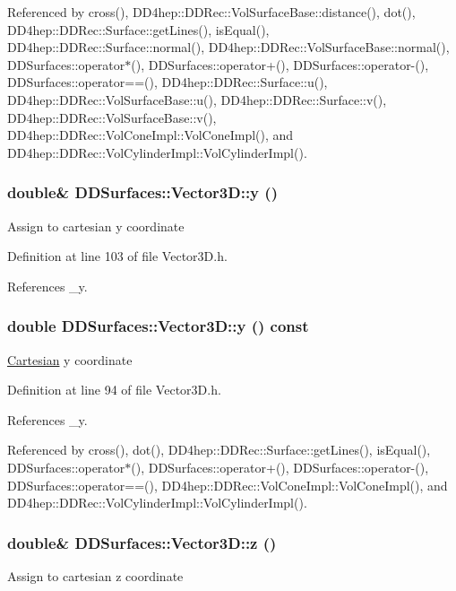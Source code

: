 Referenced by cross(), DD4hep::DDRec::VolSurfaceBase::distance(), dot(), DD4hep::DDRec::Surface::getLines(), isEqual(), DD4hep::DDRec::Surface::normal(), DD4hep::DDRec::VolSurfaceBase::normal(), DDSurfaces::operator$\ast$(), DDSurfaces::operator+(), DDSurfaces::operator-\/(), DDSurfaces::operator==(), DD4hep::DDRec::Surface::u(), DD4hep::DDRec::VolSurfaceBase::u(), DD4hep::DDRec::Surface::v(), DD4hep::DDRec::VolSurfaceBase::v(), DD4hep::DDRec::VolConeImpl::VolConeImpl(), and DD4hep::DDRec::VolCylinderImpl::VolCylinderImpl().\hypertarget{class_d_d_surfaces_1_1_vector3_d_a0ff1549e1a9f987f22f84bc4e86605db}{
\subsubsection[{y}]{\setlength{\rightskip}{0pt plus 5cm}double\& DDSurfaces::Vector3D::y ()}}
\label{class_d_d_surfaces_1_1_vector3_d_a0ff1549e1a9f987f22f84bc4e86605db}
Assign to cartesian y coordinate 

Definition at line 103 of file Vector3D.h.

References \_\-y.\hypertarget{class_d_d_surfaces_1_1_vector3_d_a3bf128e592add1be24f212696e61462c}{
\subsubsection[{y}]{\setlength{\rightskip}{0pt plus 5cm}double DDSurfaces::Vector3D::y () const}}
\label{class_d_d_surfaces_1_1_vector3_d_a3bf128e592add1be24f212696e61462c}
\hyperlink{struct_d_d_surfaces_1_1_vector3_d_1_1_cartesian}{Cartesian} y coordinate 

Definition at line 94 of file Vector3D.h.

References \_\-y.

Referenced by cross(), dot(), DD4hep::DDRec::Surface::getLines(), isEqual(), DDSurfaces::operator$\ast$(), DDSurfaces::operator+(), DDSurfaces::operator-\/(), DDSurfaces::operator==(), DD4hep::DDRec::VolConeImpl::VolConeImpl(), and DD4hep::DDRec::VolCylinderImpl::VolCylinderImpl().\hypertarget{class_d_d_surfaces_1_1_vector3_d_a3318b2914eff5012a878d22c373e9e08}{
\subsubsection[{z}]{\setlength{\rightskip}{0pt plus 5cm}double\& DDSurfaces::Vector3D::z ()}}
\label{class_d_d_surfaces_1_1_vector3_d_a3318b2914eff5012a878d22c373e9e08}
Assign to cartesian z coordinate 

